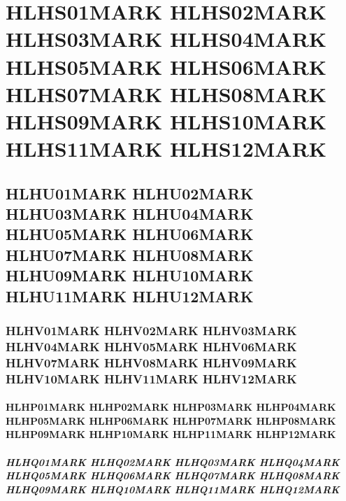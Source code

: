 \documentclass{abntexto-ufc}
\begin{document}
\textual

\section{HLHS01MARK HLHS02MARK HLHS03MARK HLHS04MARK HLHS05MARK HLHS06MARK HLHS07MARK HLHS08MARK HLHS09MARK HLHS10MARK HLHS11MARK HLHS12MARK}

\clearpage
\subsection{HLHU01MARK HLHU02MARK HLHU03MARK HLHU04MARK HLHU05MARK HLHU06MARK HLHU07MARK HLHU08MARK HLHU09MARK HLHU10MARK HLHU11MARK HLHU12MARK}

\clearpage
\subsubsection{HLHV01MARK HLHV02MARK HLHV03MARK HLHV04MARK HLHV05MARK HLHV06MARK HLHV07MARK HLHV08MARK HLHV09MARK HLHV10MARK HLHV11MARK HLHV12MARK}

\clearpage
\paragraph{HLHP01MARK HLHP02MARK HLHP03MARK HLHP04MARK HLHP05MARK HLHP06MARK HLHP07MARK HLHP08MARK HLHP09MARK HLHP10MARK HLHP11MARK HLHP12MARK}

\clearpage
\subparagraph{HLHQ01MARK HLHQ02MARK HLHQ03MARK HLHQ04MARK HLHQ05MARK HLHQ06MARK HLHQ07MARK HLHQ08MARK HLHQ09MARK HLHQ10MARK HLHQ11MARK HLHQ12MARK}
\end{document}
